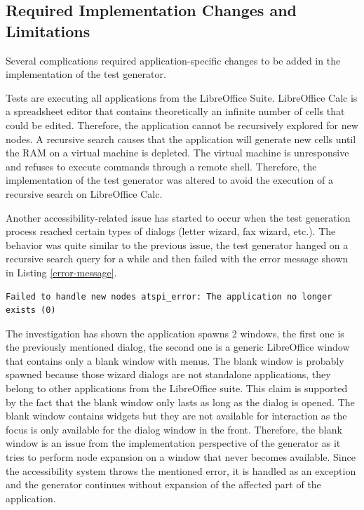 \subsection{Required Implementation Changes and Limitations}
Several complications required application-specific changes to be added in the implementation of the test generator. 

Tests are executing all applications from the LibreOffice Suite. LibreOffice Calc is a spreadsheet editor that contains theoretically an infinite number of cells that could be edited. Therefore, the application cannot be recursively explored for new nodes. A recursive search causes that the application will generate new cells until the RAM on a virtual machine is depleted. The virtual machine is unresponsive and refuses to execute commands through a remote shell. Therefore, the implementation of the test generator was altered to avoid the execution of a recursive search on LibreOffice Calc.

Another accessibility-related issue has started to occur when the test generation process reached certain types of dialogs (letter wizard, fax wizard, etc.). The behavior was quite similar to the previous issue, the test generator hanged on a recursive search query for a while and then failed with the error message shown in Listing \ref{error-message}.

\begin{lstlisting}[caption={The error that prevents the generator from node expansion},label={error-message}]
Failed to handle new nodes atspi_error: The application no longer exists (0)
\end{lstlisting}

 The investigation has shown the application spawns 2 windows, the first one is the previously mentioned dialog, the second one is a generic LibreOffice window that contains only a blank window with menus. The blank window is probably spawned because those wizard dialogs are not standalone applications, they belong to other applications from the LibreOffice suite. This claim is supported by the fact that the blank window only lasts as long as the dialog is opened. The blank window contains widgets but they are not available for interaction as the focus is only available for the dialog window in the front. Therefore, the blank window is an issue from the implementation perspective of the generator as it tries to perform node expansion on a window that never becomes available. Since the accessibility system throws the mentioned error, it is handled as an exception and the generator continues without expansion of the affected part of the application.

